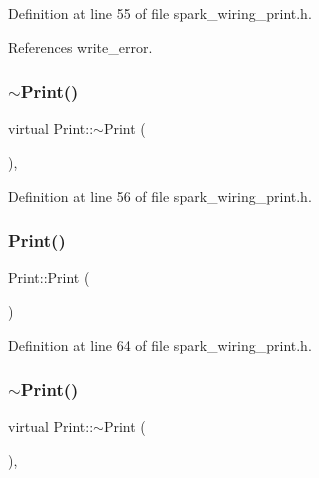Definition at line 55 of file spark\+\_\+wiring\+\_\+print.\+h.



References write\+\_\+error.

\mbox{\label{class_print_abc6ea5fd3d477d9465a57421ccd00ba4}} 
\subsubsection{\texorpdfstring{$\sim$\+Print()}{~Print()}\hspace{0.1cm}{\footnotesize\ttfamily [1/2]}}
{\footnotesize\ttfamily virtual Print\+::$\sim$\+Print (\begin{DoxyParamCaption}{ }\end{DoxyParamCaption})\hspace{0.3cm}{\ttfamily [inline]}, {\ttfamily [virtual]}}



Definition at line 56 of file spark\+\_\+wiring\+\_\+print.\+h.

\mbox{\label{class_print_a1b9fe938883bb7b4bce8fba012dab112}} 
\subsubsection{\texorpdfstring{Print()}{Print()}\hspace{0.1cm}{\footnotesize\ttfamily [2/2]}}
{\footnotesize\ttfamily Print\+::\+Print (\begin{DoxyParamCaption}{ }\end{DoxyParamCaption})\hspace{0.3cm}{\ttfamily [inline]}}



Definition at line 64 of file spark\+\_\+wiring\+\_\+print.\+h.

\mbox{\label{class_print_abc6ea5fd3d477d9465a57421ccd00ba4}} 
\subsubsection{\texorpdfstring{$\sim$\+Print()}{~Print()}\hspace{0.1cm}{\footnotesize\ttfamily [2/2]}}
{\footnotesize\ttfamily virtual Print\+::$\sim$\+Print (\begin{DoxyParamCaption}{ }\end{DoxyParamCaption})\hspace{0.3cm}{\ttfamily [inline]}, {\ttfamily [virtual]}}



